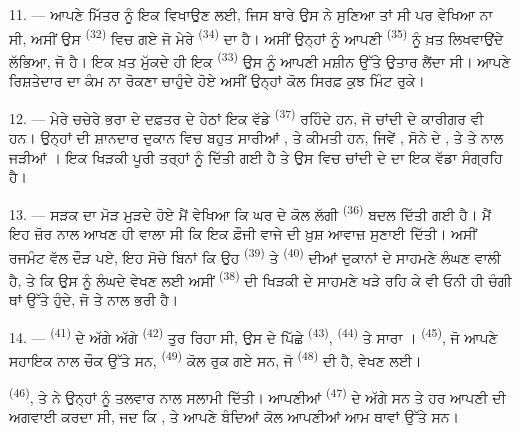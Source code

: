 \VUsaut{3.0mm}

11. --- ਆਪਣੇ ਮਿੱਤਰ ਨੂੰ ਇਕ  ਵਿਖਾਉਣ ਲਈ, ਜਿਸ ਬਾਰੇ ਉਸ ਨੇ ਸੁਣਿਆ ਤਾਂ
ਸੀ ਪਰ ਵੇਖਿਆ ਨਾ ਸੀ, ਅਸੀਂ ਉਸ  \textsuperscript{(32)} ਵਿਚ ਗਏ ਜੋ ਮੇਰੇ
 \textsuperscript{(34)} ਦਾ ਹੈ। ਅਸੀਂ ਉਨ੍ਹਾਂ ਨੂੰ ਆਪਣੀ
 \textsuperscript{(35)} ਨੂੰ ਖ਼ਤ ਲਿਖਵਾਉਂਦੇ ਲੱਭਿਆ, ਜੋ
 ਹੈ। ਇਕ ਖ਼ਤ ਮੁੱਕਦੇ ਹੀ ਇਕ  \textsuperscript{(33)} ਉਸ
ਨੂੰ ਆਪਣੀ ਮਸ਼ੀਨ ਉੱਤੇ ਉਤਾਰ ਲੈਂਦਾ ਸੀ। ਆਪਣੇ ਰਿਸ਼ਤੇਦਾਰ ਦਾ ਕੰਮ ਨਾ ਰੋਕਣਾ ਚਾਹੁੰਦੇ ਹੋਏ ਅਸੀਂ
ਉਨ੍ਹਾਂ ਕੋਲ ਸਿਰਫ਼ ਕੁਝ ਮਿੰਟ ਰੁਕੇ।

12. --- ਮੇਰੇ ਚਚੇਰੇ ਭਰਾ ਦੇ ਦਫ਼ਤਰ ਦੇ ਹੇਠਾਂ ਇਕ ਵੱਡੇ 
\textsuperscript{(37)} ਰਹਿੰਦੇ ਹਨ, ਜੋ ਚਾਂਦੀ ਦੇ ਕਾਰੀਗਰ ਵੀ ਹਨ। ਉਨ੍ਹਾਂ ਦੀ ਸ਼ਾਨਦਾਰ ਦੁਕਾਨ
ਵਿਚ ਬਹੁਤ ਸਾਰੀਆਂ ,
 ਤੇ ਕੀਮਤੀ  ਹਨ, ਜਿਵੇਂ ,
ਸੋਨੇ ਦੇ ,  ਤੇ  ਤੇ
 ਨਾਲ ਜੜੀਆਂ । ਇਕ ਖਿੜਕੀ ਪੂਰੀ ਤਰ੍ਹਾਂ
 ਨੂੰ ਦਿੱਤੀ ਗਈ ਹੈ ਤੇ ਉਸ ਵਿਚ ਚਾਂਦੀ ਦੇ
 ਦਾ ਇਕ ਵੱਡਾ ਸੰਗ੍ਰਹਿ ਹੈ।

13. --- ਸੜਕ ਦਾ ਮੋੜ ਮੁੜਦੇ ਹੋਏ ਮੈਂ ਵੇਖਿਆ ਕਿ ਘਰ ਦੇ  ਕੋਲ ਲੱਗੀ
 \textsuperscript{(36)} ਬਦਲ ਦਿੱਤੀ ਗਈ ਹੈ। ਮੈਂ ਇਹ ਜ਼ੋਰ ਨਾਲ ਆਖਣ ਹੀ
ਵਾਲਾ ਸੀ ਕਿ ਇਕ ਫ਼ੌਜੀ ਵਾਜੇ ਦੀ ਖ਼ੁਸ਼ ਆਵਾਜ਼ ਸੁਣਾਈ ਦਿੱਤੀ। ਅਸੀਂ ਰਜਮੰਟ ਵੱਲ ਦੌੜ ਪਏ, ਇਹ ਸੋਚੇ
ਬਿਨਾਂ ਕਿ ਉਹ  \textsuperscript{(39)} ਤੇ 
\textsuperscript{(40)} ਦੀਆਂ ਦੁਕਾਨਾਂ ਦੇ ਸਾਹਮਣੇ ਲੰਘਣ ਵਾਲੀ ਹੈ, ਤੇ ਕਿ ਉਸ ਨੂੰ ਲੰਘਦੇ ਵੇਖਣ
ਲਈ ਅਸੀਂ  \textsuperscript{(38)} ਦੀ ਖਿੜਕੀ ਦੇ ਸਾਹਮਣੇ ਖੜੇ ਰਹਿ ਕੇ ਵੀ
ਓਨੀ ਹੀ ਚੰਗੀ ਥਾਂ ਉੱਤੇ ਹੁੰਦੇ, ਜੋ  ਤੇ 
ਨਾਲ ਭਰੀ ਹੈ।

\VUsaut{3.0mm}

14. ---  \textsuperscript{(41)} ਦੇ ਅੱਗੇ ਅੱਗੇ 
\textsuperscript{(42)} ਤੁਰ ਰਿਹਾ ਸੀ, ਉਸ ਦੇ ਪਿੱਛੇ 
\textsuperscript{(43)},  \textsuperscript{(44)} ਤੇ ਸਾਰਾ
।  \textsuperscript{(45)}, ਜੋ ਆਪਣੇ ਸਹਾਇਕ ਨਾਲ ਚੌਕ ਉੱਤੇ
ਸਨ,  \textsuperscript{(49)} ਕੋਲ ਰੁਕ ਗਏ ਸਨ, ਜੋ
 \textsuperscript{(48)} ਦੀ ਹੈ,  ਵੇਖਣ ਲਈ।

 \textsuperscript{(46)},  ਤੇ
 ਨੇ ਉਨ੍ਹਾਂ ਨੂੰ ਤਲਵਾਰ ਨਾਲ ਸਲਾਮੀ ਦਿੱਤੀ।  ਆਪਣੀਆਂ
 \textsuperscript{(47)} ਦੇ ਅੱਗੇ ਸਨ ਤੇ ਹਰ  ਆਪਣੀ
 ਦੀ ਅਗਵਾਈ ਕਰਦਾ ਸੀ, ਜਦ ਕਿ ,
 ਤੇ  ਆਪਣੇ ਬੰਦਿਆਂ ਕੋਲ ਆਪਣੀਆਂ ਆਮ
ਥਾਵਾਂ ਉੱਤੇ ਸਨ।

